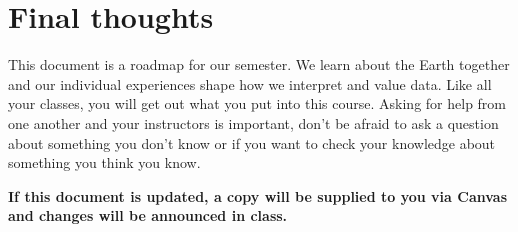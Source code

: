 \documentclass[11pt,]{article}
\begin{document}
\hypertarget{final-thoughts}{%
\section{Final thoughts}\label{final-thoughts}}

This document is a roadmap for our semester. We learn about the Earth
together and our individual experiences shape how we interpret and value
data. Like all your classes, you will get out what you put into this
course. Asking for help from one another and your instructors is
important, don't be afraid to ask a question about something you don't
know or if you want to check your knowledge about something you think
you know.

\textbf{If this document is updated, a copy will be supplied to you via
Canvas and changes will be announced in class.}

\end{document}
